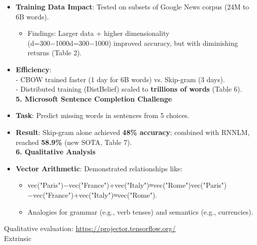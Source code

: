 \documentclass[
]{article}
\providecommand{\tightlist}{%
  \setlength{\itemsep}{0pt}\setlength{\parskip}{0pt}}
\begin{document}
\begin{itemize}
  \begin{itemize}
  \tightlist
  \item
    Skip-gram outperformed CBOW on \textbf{semantic tasks} (55\% vs.
    24\% accuracy).
  \item
    CBOW was better for \textbf{syntactic tasks} (64\% vs. 59\%).
  \item
    Both models surpassed NNLM and RNNLM in accuracy and training speed
    (Table 3).\\
    \textbf{4. Scaling Experiments}
  \end{itemize}
\item
  \textbf{Training Data Impact}: Tested on subsets of Google News corpus
  (24M to 6B words).

  \begin{itemize}
  \tightlist
  \item
    Findings: Larger data + higher dimensionality (d=300−1000d=300−1000)
    improved accuracy, but with diminishing returns (Table 2).
  \end{itemize}
\item
  \textbf{Efficiency}:\\
  - CBOW trained faster (1 day for 6B words) vs. Skip-gram (3 days).\\
  - Distributed training (DistBelief) scaled to \textbf{trillions of
  words} (Table 6).\\
  \textbf{5. Microsoft Sentence Completion Challenge}
\item
  \textbf{Task}: Predict missing words in sentences from 5 choices.
\item
  \textbf{Result}: Skip-gram alone achieved \textbf{48\% accuracy};
  combined with RNNLM, reached \textbf{58.9\%} (new SOTA, Table 7).\\
  \textbf{6. Qualitative Analysis}
\item
  \textbf{Vector Arithmetic}: Demonstrated relationships like:

  \begin{itemize}
  \tightlist
  \item
    vec("Paris")−vec("France")+vec("Italy")≈vec("Rome")vec("Paris")−vec("France")+vec("Italy")≈vec("Rome").
  \item
    Analogies for grammar (e.g., verb tenses) and semantics (e.g.,
    currencies).
  \end{itemize}
\end{itemize}

Qualitative evaluation: \url{https://projector.tensorflow.org/}\\
Extrinsic
\end{document}
